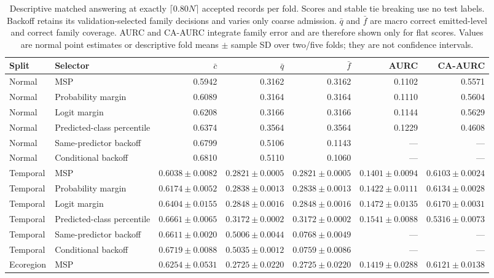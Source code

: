 \begin{table}[htbp]
\centering\scriptsize
\setlength{\tabcolsep}{2.3pt}
\caption{Descriptive matched answering at exactly $\lceil0.80N\rceil$ accepted records per fold. Scores and stable tie breaking use no test labels. Backoff retains its validation-selected family decisions and varies only coarse admission. $\bar q$ and $\bar f$ are macro correct emitted-level and correct family coverage. AURC and CA-AURC integrate family error and are therefore shown only for flat scores. Values are normal point estimates or descriptive fold means $\pm$ sample SD over two/five folds; they are not confidence intervals.}\label{tab:supp-matched-selection}
\begin{tabular}{llrrrrr}
\toprule
Split & Selector & $\bar c$ & $\bar q$ & $\bar f$ & AURC & CA-AURC \\
\midrule
Normal & MSP & 0.5942 & 0.3162 & 0.3162 & 0.1102 & 0.5571 \\
Normal & Probability margin & 0.6089 & 0.3164 & 0.3164 & 0.1110 & 0.5604 \\
Normal & Logit margin & 0.6208 & 0.3166 & 0.3166 & 0.1144 & 0.5629 \\
Normal & Predicted-class percentile & 0.6374 & 0.3564 & 0.3564 & 0.1229 & 0.4608 \\
Normal & Same-predictor backoff & 0.6799 & 0.5106 & 0.1143 & --- & --- \\
Normal & Conditional backoff & 0.6810 & 0.5110 & 0.1060 & --- & --- \\
Temporal & MSP & $0.6038\pm0.0082$ & $0.2821\pm0.0005$ & $0.2821\pm0.0005$ & $0.1401\pm0.0094$ & $0.6103\pm0.0024$ \\
Temporal & Probability margin & $0.6174\pm0.0052$ & $0.2838\pm0.0013$ & $0.2838\pm0.0013$ & $0.1422\pm0.0111$ & $0.6134\pm0.0028$ \\
Temporal & Logit margin & $0.6404\pm0.0155$ & $0.2848\pm0.0016$ & $0.2848\pm0.0016$ & $0.1472\pm0.0135$ & $0.6170\pm0.0031$ \\
Temporal & Predicted-class percentile & $0.6661\pm0.0065$ & $0.3172\pm0.0002$ & $0.3172\pm0.0002$ & $0.1541\pm0.0088$ & $0.5316\pm0.0073$ \\
Temporal & Same-predictor backoff & $0.6611\pm0.0020$ & $0.5006\pm0.0044$ & $0.0768\pm0.0049$ & --- & --- \\
Temporal & Conditional backoff & $0.6719\pm0.0088$ & $0.5035\pm0.0012$ & $0.0759\pm0.0086$ & --- & --- \\
Ecoregion & MSP & $0.6254\pm0.0531$ & $0.2725\pm0.0220$ & $0.2725\pm0.0220$ & $0.1419\pm0.0288$ & $0.6121\pm0.0138$ \\

\end{tabular}
\end{table}
